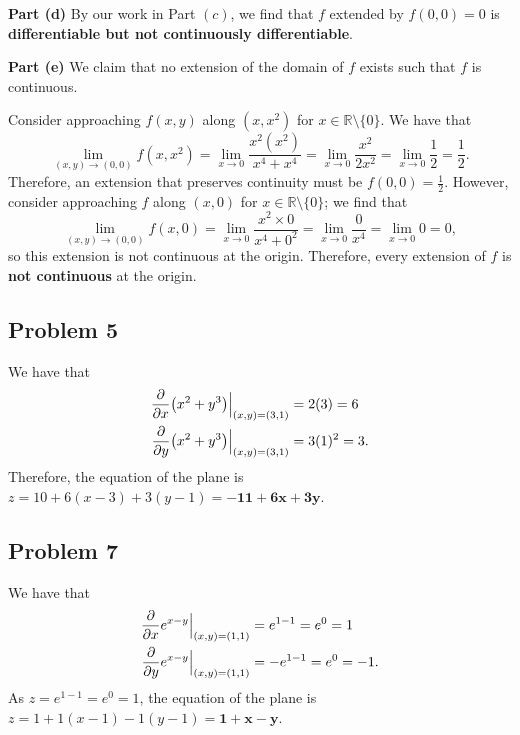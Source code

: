 \documentclass[11pt]{article}
\begin{document}

\textbf{Part (d)} By our work in Part $(c)$, we find that $f$ extended by $f(0, 0) = 0$ is \textbf{differentiable but not continuously differentiable}.


\textbf{Part (e)} We claim that no extension of the domain of $f$ exists such that $f$ is continuous.

Consider approaching $f(x, y)$ along $(x, x^{2})$ for $x \in \mathbb{R} \setminus \{ 0 \}$. We have that
\[
	\lim\limits_{(x, y) \to (0, 0)} f(x, x^{2}) = \lim\limits_{x \to 0} \frac{x^{2}(x^{2})}{x^{4} + x^{4}} = \lim\limits_{x \to 0} \frac{x^{2}}{2x^{2}} = \lim\limits_{x \to 0} \frac{1}{2} = \frac{1}{2}.	
\]
Therefore, an extension that preserves continuity must be $f(0, 0) = \tfrac{1}{2}$. However, consider approaching $f$ along $(x, 0)$ for $x \in \mathbb{R} \setminus \{ 0 \}$; we find that
\[
	\lim\limits_{(x, y) \to (0, 0)} f(x, 0) = \lim\limits_{x \to 0} \frac{x^{2} \times 0}{x^{4} + 0^{2}} = \lim\limits_{x \to 0} \frac{0}{x^{4}} = \lim\limits_{x \to 0} 0 = 0,
\]
so this extension is not continuous at the origin. Therefore, every extension of $f$ is \textbf{not continuous} at the origin.


\subsection{Problem 5}

We have that
\begin{align*}
	\pdv{x}(x^{2} + y^{3}) \Big|_{(x, y) = (3, 1)} &= 2(3) = 6 \\
	\pdv{y}(x^{2} + y^{3}) \Big|_{(x, y) = (3, 1)} &= 3(1)^{2} = 3.
\end{align*}
Therefore, the equation of the plane is $z = 10 + 6(x - 3) + 3(y - 1) = \mathbf{-11 + 6x + 3y}$.


\subsection{Problem 7}

We have that
\begin{align*}
	\pdv{x} e^{x - y} \Big|_{(x, y) = (1, 1)} &= e^{1 - 1} = e^{0} = 1 \\
	\pdv{y} e^{x - y} \Big|_{(x, y) = (1, 1)} &= -e^{1 - 1} = e^{0} = -1.
\end{align*}
As $z = e^{1 - 1} = e^{0} = 1$, the equation of the plane is $z = 1 + 1(x - 1) - 1(y - 1) = \mathbf{1 + x - y}$.
\end{document}
